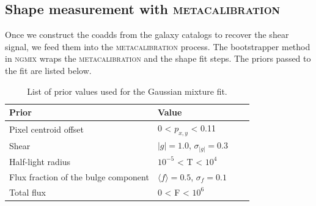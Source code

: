 \documentclass[fleqn,usenatbib]{mnras}
\begin{document}
\subsection{Shape measurement with \textsc{metacalibration}}
\label{subsec:mcal}
Once we construct the coadds from the galaxy catalogs to recover the shear signal, we feed them into the \textsc{metacalibration} process. The bootstrapper method in \textsc{ngmix} wraps the \textsc{metacalibration} and the shape fit steps. The priors passed to the fit are listed below. 

\begin{table}
    \centering
    \begin{tabular}{|p{3cm}||p{3cm}|p{3cm}|p{3cm}|}
    \hline
    Prior & Value \\
    \hline
    Pixel centroid offset & 0 < $p_{x,y}$ < 0.11\\
    Shear & $|g|=1.0$, $\sigma_{|g|} = 0.3$\\
    Half-light radius & $10^{-5}$ < T < $10^{4}$\\
    Flux fraction of the bulge component & $\langle f\rangle = 0.5$, $\sigma_{f} = 0.1$\\
    Total flux & $0$ < F < $10^{6}$\\
    \hline
    \end{tabular}
    \caption{List of prior values used for the Gaussian mixture fit.}
    \label{tab:priors}
\end{table}
\end{document}
